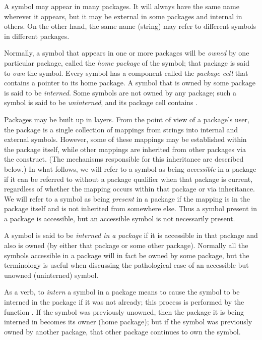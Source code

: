 A symbol may appear in many packages.  It will always have the same
name wherever it appears, but it may be external in some packages
and internal in others.  On the other hand,
the same name (string) may refer to different symbols in
different packages.

Normally, a symbol that appears in one or more packages
will be {\it owned} by one particular package, called the {\it home package}
of the symbol; that package is said to {\it own} the symbol.
Every symbol has a component called the {\it package cell}
that contains a pointer to its home package.
A symbol that is owned by some package is said to be {\it interned}.
Some symbols are not owned by any package; such a symbol
is said to be {\it uninterned}, and its package cell contains {\false}.

Packages may be built up in layers.  From the point of view of a
package's user, the package is a single collection of mappings from
strings into internal and external symbols.  However, some of these
mappings may be established within the package itself, while other
mappings are inherited from other packages via the 
construct.  (The mechanisms responsible for this inheritance are
described below.)  In what follows, we will refer to a symbol as being
{\it accessible} in a package if it can be referred to
without a package qualifier when that package is current,
regardless of whether the mapping occurs within
that package or via inheritance.   We will refer to a symbol as being
{\it present} in a package if the mapping is in the package itself and is
not inherited from somewhere else.  Thus a symbol present in a package is accessible,
but an accessible symbol is not necessarily present.

A symbol is said to be {\it interned in a package} if it is
accessible in that package and also is owned (by either that package
or some other package).  Normally all the symbols accessible in
a package will in fact be owned by some package,
but the terminology is useful when
discussing the pathological case of an accessible but unowned (uninterned)
symbol.

As a verb, to {\it intern} a symbol in a package means to cause the
symbol to be interned in the package if it was not already;
this process is performed by the function .
If the symbol was previously unowned, then the package it is being
interned in becomes its owner (home package); but
if the symbol was previously owned by another package, that other package
continues to own the symbol.

